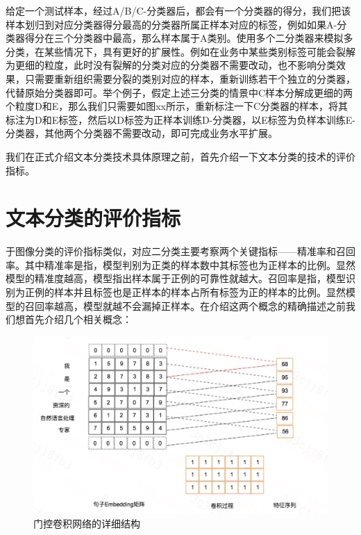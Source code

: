 \documentclass[twoside,a4paper,12pt]{book}%
\begin{document}
给定一个测试样本，经过A/B/C-分类器后，都会有一个分类器的得分，我们把该样本划归到对应分类器得分最高的分类器所属正样本对应的标签，例如如果A-分类器得分在三个分类器中最高，那么样本属于A类别。使用多个二分类器来模拟多分类，在某些情况下，具有更好的扩展性。例如在业务中某些类别标签可能会裂解为更细的粒度，此时没有裂解的分类对应的分类器不需要改动，也不影响分类效果，只需要重新组织需要分裂的类别对应的样本，重新训练若干个独立的分类器，代替原始分类器即可。举个例子，假定上述三分类的情景中C样本分解成更细的两个粒度D和E，那么我们只需要如图xx所示，重新标注一下C分类器的样本，将其标注为D和E标签，然后以D标签为正样本训练D-分类器，以E标签为负样本训练E-分类器，其他两个分类器不需要改动，即可完成业务水平扩展。

我们在正式介绍文本分类技术具体原理之前，首先介绍一下文本分类的技术的评价指标。


\section{文本分类的评价指标}
于图像分类的评价指标类似，对应二分类主要考察两个关键指标——精准率和召回率。其中精准率是指，模型判别为正类的样本数中其标签也为正样本的比例。显然模型的精准度越高，模型指出样本属于正例的可靠性就越大。召回率是指，模型识别为正例的样本并且标签也是正样本的样本占所有标签为正的样本的比例。显然模型的召回率越高，模型就越不会漏掉正样本。在介绍这两个概念的精确描述之前我们想首先介绍几个相关概念：

\begin{figure}[htbp]
\begin{center}
\includegraphics[width=5.5in]{figures/textcnn2.png}
\caption{门控卷积网络的详细结构}
\label{default}
\end{center}
\end{figure}
\end{document}
